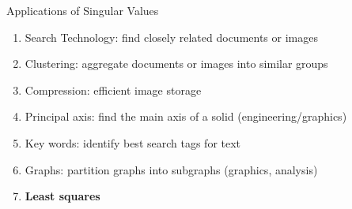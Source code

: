 \documentclass[10pt]{beamer}
\begin{document}


\begin{frame}{Applications of Singular Values}

\begin{enumerate}
    \item Search Technology: find closely related documents or images 
    \item Clustering: aggregate documents or images into similar groups
    \item Compression: efficient image storage
    \item Principal axis: find the main axis of a solid (engineering/graphics)
    \item Key words: identify best search tags for text
    \item Graphs: partition graphs into subgraphs (graphics, analysis)
    \item \textbf{Least squares}
\end{enumerate}

\end{frame}


\end{document}
